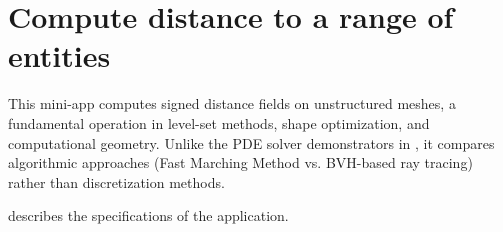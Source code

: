 
\section{Compute distance to a range of entities}
\label{sec:app:specs:app-feelpp-distance}

This mini-app computes signed distance fields on unstructured meshes, a fundamental operation in level-set methods, shape optimization, and computational geometry. Unlike the PDE solver demonstrators in , it compares algorithmic approaches (Fast Marching Method vs. BVH-based ray tracing) rather than discretization methods.

 describes the specifications of the application.

